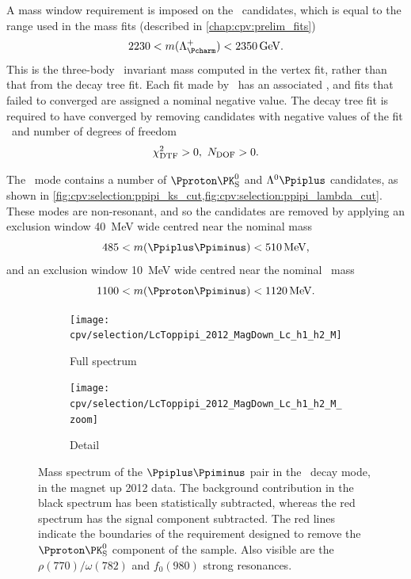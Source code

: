 A mass window requirement is imposed on the \PLambdac\ candidates, which is 
equal to the range used in the mass fits (described in 
\cref{chap:cpv:prelim_fits})
\begin{equation}
  2230 < m(\PLambdac) < \SI{2350}{\GeV}.
  \label{eqn:cpv:selection:mass_window}
\end{equation}
This is the three-body \phh\ invariant mass computed in the vertex fit, rather 
than that from the decay tree fit.
Each fit made by \decaytreefitter\ has an associated \chisq, and fits that 
failed to converged are assigned a nominal negative value.
The decay tree fit is required to have converged by removing candidates with 
negative values of the fit \chisq\ and number of degrees of freedom
\begin{equation}
  \chi^2_{\text{DTF}} > 0,\ N_{\text{DOF}} > 0.
  \label{eqn:selection:dtf_convergence}
\end{equation}

The \ppipi\ mode contains a number of $\Pproton\PKshort$ and $\PLambda\Ppiplus$ 
candidates, as shown in 
\cref{fig:cpv:selection:ppipi_ks_cut,fig:cpv:selection:ppipi_lambda_cut}.
These modes are non-resonant, and so the candidates are removed by applying an 
exclusion window \SI{40}{\MeV} wide centred near the nominal \PKshort 
mass~\cite{PDG2014}
\begin{equation}
  485 < m(\Ppiplus\Ppiminus) < \SI{510}{\MeV},
\end{equation}
and an exclusion window \SI{10}{\MeV} wide centred near the nominal \PLambda\ 
mass~\cite{PDG2014}
\begin{equation}
  1100 < m(\Pproton\Ppiminus) < \SI{1120}{\MeV}.
\end{equation}

\begin{figure}
  \begin{subfigure}[b]{0.5\textwidth}
    \texttt{[image: cpv/selection/LcToppipi\_2012\_MagDown\_Lc\_h1\_h2\_M]}
    \caption{Full spectrum}
    \label{fig:cpv:selection:ppipi_ks_cut:full}
  \end{subfigure}
  \begin{subfigure}[b]{0.5\textwidth}
    \texttt{[image: cpv/selection/LcToppipi\_2012\_MagDown\_Lc\_h1\_h2\_M\_zoom]}
    \caption{Detail}
    \label{fig:cpv:selection:ppipi_ks_cut:zoom}
  \end{subfigure}
  \caption{%
    Mass spectrum of the $\Ppiplus\Ppiminus$ pair in the \ppipi\ decay mode, in 
    the magnet up 2012 data.
    The background contribution in the black spectrum has been statistically 
    subtracted, whereas the red spectrum has the signal component subtracted.
    The red lines indicate the boundaries of the requirement designed to remove 
    the $\Pproton\PKshort$ component of the sample.
    Also visible are the $\rho(770)/\omega(782)$ and $f_{0}(980)$ strong 
    resonances.
  }
  \label{fig:cpv:selection:ppipi_ks_cut}
\end{figure}

